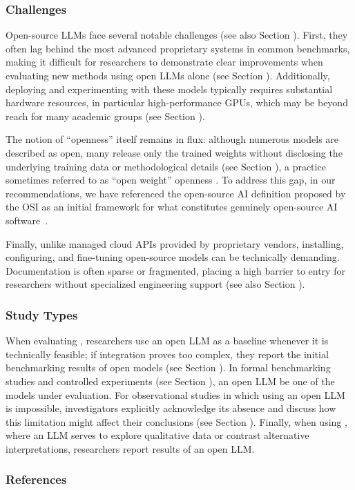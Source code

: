 \subsubsection{Challenges}

Open-source LLMs face several notable challenges (see also Section \limitationsmitigations).
First, they often lag behind the most advanced proprietary systems in common benchmarks, making it difficult for researchers to demonstrate clear improvements when evaluating new methods using open LLMs alone (see Section \benchmarksmetrics).
Additionally, deploying and experimenting with these models typically requires substantial hardware resources, in particular high-performance GPUs, which may be beyond reach for many academic groups (see Section \toolarchitecture). 

The notion of ``openness'' itself remains in flux: although numerous models are described as open, many release only the trained weights without disclosing the underlying training data or methodological details (see Section \modelversion), a practice sometimes referred to as ``open weight'' openness \cite{Gibney2024}.
To address this gap, in our recommendations, we have referenced the open-source AI definition proposed by the OSI as an initial framework for what constitutes genuinely open-source AI software~\cite{OSIAI2024}. 

Finally, unlike managed cloud APIs provided by proprietary vendors, installing, configuring, and fine-tuning open-source models can be technically demanding.
Documentation is often sparse or fragmented, placing a high barrier to entry for researchers without specialized engineering support (see also Section \limitationsmitigations).

\subsubsection{Study Types}

When evaluating \newtools, researchers \should use an open LLM as a baseline whenever it is technically feasible; if integration proves too complex, they \should report the initial benchmarking results of open models (see Section \benchmarksmetrics).
In formal benchmarking studies and controlled experiments (see Section \benchmarkingtasks), an open LLM \must be one of the models under evaluation.
For observational studies in which using an open LLM is impossible, investigators \should explicitly acknowledge its absence and discuss how this limitation might affect their conclusions (see Section \limitationsmitigations).
Finally, when using \synthesis,  where an LLM serves to explore qualitative data or contrast alternative interpretations, researchers \may report results of an open LLM.

\subsubsection{References}






